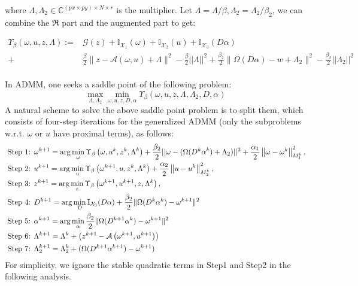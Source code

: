\documentclass{article}
\numberwithin{equation}{section}
\begin{document}
where $\Lambda,\Lambda_2 \in \mathbb{C}^{(px \times py) \times N \times r}$ is the multiplier.
Let $\Lambda = \Lambda / \beta, \Lambda_2 = \Lambda_2 / \beta_2$, we can combine the $\Re$ part and the augmented part to get:

\begin{equation}
\begin{aligned}
\Upsilon_{\beta}(\omega, u, z, \Lambda):=&\mathcal{G}(z)+\mathbb{I}_{\mathcal{X}_{1}}(\omega)+\mathbb{I}_{\mathcal{X}_{2}}(u)+ \mathbb{I}_{\mathcal{X}_{3}}(D\alpha)  \\
+&\frac{\beta}{2}\|z-\mathcal{A}(\omega, u) + \Lambda \|^{2} - \frac{\beta}{2}||\Lambda||^2 +\frac{\beta_2}{2}\| \Omega(D\alpha) - w + \Lambda_2\|^{2} - \frac{\beta_2}{2}||\Lambda_2||^2 \\
\end{aligned}
\end{equation} 

In ADMM, one seeks a saddle point of the following problem:
$$
\max _{\Lambda,\Lambda_2} \min _{\omega, u, z,D,\alpha} \Upsilon_{\beta}(\omega, u, z, \Lambda,\Lambda_2,D,\alpha)
$$
A natural scheme to solve the above saddle point problem is to split them, which consists of four-step iterations for the generalized ADMM (only the subproblems w.r.t. $\omega$ or $u$ have proximal terms), as follows:
\begin{align}
\text { Step 1: } & \omega^{k+1}=\arg \min _{\omega} \Upsilon_{\beta}\left(\omega, u^{k}, z^{k}, \Lambda^{k}\right)+
\frac{\beta_{2}}{2}||\omega - (\Omega(D^k\alpha^k) + \Lambda_2)||^2 + 
\frac{\alpha_{1}}{2}\left\|\omega-\omega^{k}\right\|_{M_{1}^{k}}^{2}, \notag \\
 \text { Step 2: } & u^{k+1}=\arg \min _{u} \Upsilon_{\beta}\left(\omega^{k+1}, u, z^{k}, \Lambda^{k}\right)+\frac{\alpha_{2}}{2}\left\|u-u^{k}\right\|_{M_{2}^{k}}^{2}, \notag \\ \text { Step 3: } & z^{k+1}=\arg \min _{z} \Upsilon_{\beta}\left(\omega^{k+1}, u^{k+1}, z, \Lambda^{k}\right), \notag \\
 \text { Step 4: } & D^{k+1}=\arg \min _{D} \mathbb{I}_{\mathcal{X}_{3}}(D\alpha) +
  \frac{\beta_2}{2}\| \Omega(D^k\alpha^k) - \omega^{k+1}\|^{2} \notag \\
 \text { Step 5: } & \alpha^{k+1}=\arg \min _{\alpha}  \frac{\beta_2}{2}\| \Omega(D^{k+1}\alpha^k) - \omega^{k+1}\|^{2}\notag \\
  \text { Step 6: } &
 \Lambda^{k+1}=\Lambda^{k}+\left(z^{k+1}-\mathcal{A}\left(\omega^{k+1}, u^{k+1}\right)\right)  \label{Lup}\\
 \text { Step 7: } & \Lambda_2^{k+1}=\Lambda_2^{k}+ (\Omega(D^{k+1}\alpha^{k+1}) - \omega^{k+1}) \label{L2up}
 \end{align}
For simplicity, we ignore the stable quadratic terms in Step1 and Step2 in the following analysis.
\end{document}
